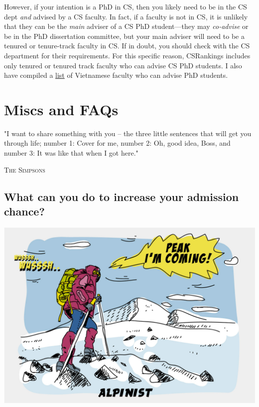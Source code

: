 \documentclass[11pt]{article}
\begin{document}
However, if your intention is a PhD in CS, then you likely need to be in the CS dept \emph{and} advised by a CS faculty. In fact, if a faculty is not in CS, it is unlikely that they can be the \emph{main} adviser of a CS PhD student---they may \emph{co-advise} or be in the PhD dissertation committee, but your main adviser will need to be a tenured or tenure-track faculty in CS. If in doubt, you should check with the CS department for their requirements.  For this specific reason,  CSRankings includes only tenured or tenured track faculty who can advise CS PhD students. I also have compiled a \href{https://github.com/dynaroars/dynaroars.github.io/wiki/Viet-CS-Profs-US}{list} of Vietnamese faculty who can advise PhD students. 


\section{Miscs and FAQs}
\epigraph{"I want to share something with you – the three little sentences that will get you through life; number 1: Cover for me, number 2: Oh, good idea, Boss, and number 3: It was like that when I got here."}{\textsc{The Simpsons}}

\subsection{What can you do to increase your admission chance?}\label{sec:improve-your-chance}


\begin{center}
    \includegraphics[scale=0.2]{alpinist-climbing-peak-mountain-comic-hand-drawn-vector-illustration.jpg}
  \end{center}
\end{document}
